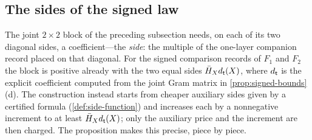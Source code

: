 \subsection{The sides of the signed law}\label{subsec:signed-sides}

The joint $2\times2$ block of the preceding subsection needs, on
each of its two diagonal sides, a coefficient---the \emph{side}:
the multiple of the one-layer companion record placed on that
diagonal. For the signed comparison records of $F_1$ and $F_2$
the block is positive already with the two equal sides
$\bar H_Xd_\mathsf t(X)$, where $d_\mathsf t$ is the explicit coefficient
computed from the joint Gram matrix in
\cref{prop:signed-bounds}(d). The construction instead starts
from cheaper auxiliary sides given by a certified formula
(\cref{def:side-function}) and increases each by a nonnegative
increment to at least $\bar H_Xd_\mathsf t(X)$; only the auxiliary
price and the increment are then charged. The proposition makes
this precise, piece by piece.

